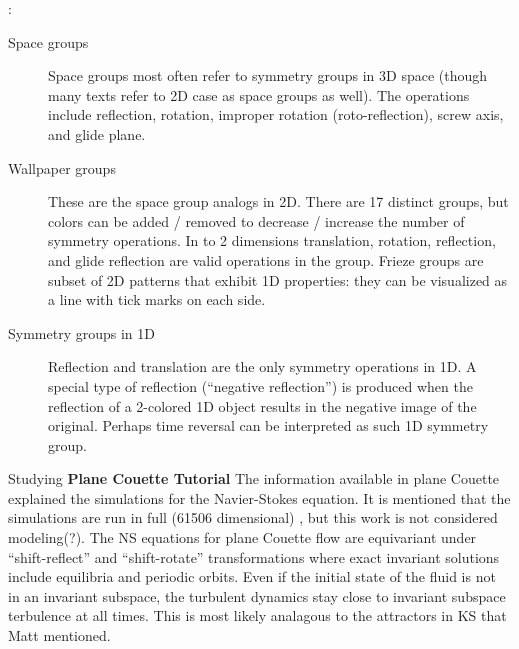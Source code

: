 \begin{description}
{ :
\begin{description}
  \item[Space groups]
Space groups most often refer to symmetry groups in 3D space (though many
texts refer to 2D case as space groups as well). The operations include
reflection, rotation, improper rotation (roto-reflection), screw axis, and
glide plane.
  \item[Wallpaper groups]
These are the space group analogs in 2D. There are 17 distinct groups, but
colors can be added / removed to decrease / increase the number of symmetry
operations. In to 2 dimensions translation, rotation, reflection, and glide
reflection are valid operations in the group. Frieze groups are subset of 2D
patterns that exhibit 1D properties: they can be visualized as a line with
tick marks on each side.
  \item[Symmetry groups in 1D]
Reflection and translation are the only symmetry operations in 1D. A special
type of reflection (``negative reflection'') is produced when the reflection
of a 2-colored 1D object results in the negative image of the original.
Perhaps time reversal can be interpreted as such 1D symmetry group.
\end{description}
}



{ Studying
{\bf Plane Couette Tutorial}
The information available in plane Couette
 explained the {\statesp}
simulations for the Navier-Stokes equation. It is mentioned that the
simulations are run in full (61506 dimensional) {\statesp}, but this work
is not considered modeling(?). The NS equations for plane Couette flow are
equivariant under ``shift-reflect'' and ``shift-rotate'' transformations where
exact invariant solutions include equilibria and periodic orbits. Even if the
initial state of the fluid is not in an invariant subspace, the turbulent
dynamics stay close to invariant subspace terbulence at all times. This is
most likely analagous to the attractors in KS that Matt mentioned.

}
\end{description}
